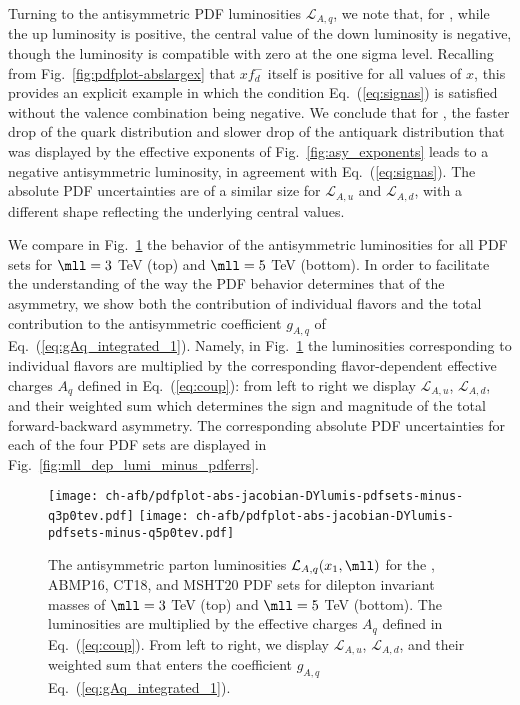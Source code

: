 Turning to the antisymmetric PDF luminosities $\mathcal{L}_{A,q}$,
we note  that, for , while the up luminosity is
positive, the central value of the down luminosity is negative, though
the luminosity is compatible with zero at the one sigma level.
%
Recalling
from Fig.~\ref{fig:pdfplot-abslargex} that $xf_{d}^-$ itself is
positive for all values of $x$,  this provides an explicit example in
which the condition Eq.~(\ref{eq:signas}) is satisfied without the valence
combination being negative.
%
We conclude that for , the faster
drop of the quark distribution and slower drop of the antiquark
distribution that was displayed by the effective exponents of
Fig.~\ref{fig:asy_exponents} leads to a negative antisymmetric
luminosity, in agreement with Eq.~(\ref{eq:signas}).
The absolute PDF uncertainties are of a similar size for
$\mathcal{L}_{A,u}$ and $\mathcal{L}_{A,d}$, with a different shape
reflecting the underlying central values.

We compare
in Fig.~\ref{fig:mll_dep_lumi_minus}
the behavior of the antisymmetric luminosities for all PDF
sets for $\mll=3$ TeV (top) and $\mll=5$ TeV (bottom).
%
In order to facilitate the understanding of the way the PDF behavior
determines that of the asymmetry, we show both the contribution of
individual flavors and the total contribution
to the antisymmetric coefficient $g_{A,q}$ of
Eq.~(\ref{eq:gAq_integrated_1}). Namely, in
Fig.~\ref{fig:mll_dep_lumi_minus} the luminosities corresponding to
individual flavors are multiplied by the corresponding flavor-dependent
effective charges $A_q$ defined in Eq.~(\ref{eq:coup}):
from left to right we display $\mathcal{L}_{A,u}$,  $\mathcal{L}_{A,d}$,
and their weighted sum
 which determines
the sign and magnitude of the total forward-backward asymmetry.
%
The corresponding absolute PDF uncertainties for each of the four PDF sets
are displayed in  Fig.~\ref{fig:mll_dep_lumi_minus_pdferrs}.

\begin{figure}[!t]
 \centering
 \texttt{[image: ch-afb/pdfplot-abs-jacobian-DYlumis-pdfsets-minus-q3p0tev.pdf]}
 \texttt{[image: ch-afb/pdfplot-abs-jacobian-DYlumis-pdfsets-minus-q5p0tev.pdf]}
 \caption{The antisymmetric 
   parton luminosities $\mathcal{L}_{A,q}(x_1,\mll)$ for the , ABMP16,
   CT18, and MSHT20 \nnlo PDF sets for dilepton
   invariant masses of
   $\mll=3$ TeV (top) and $\mll=5$ TeV (bottom).
   The luminosities are multiplied by the effective charges
   $A_q$ defined in Eq.~(\ref{eq:coup}).
   From left to right, we display $\mathcal{L}_{A,u}$,  $\mathcal{L}_{A,d}$,
   and their weighted sum that enters the  coefficient $g_{A,q}$ Eq.~(\ref{eq:gAq_integrated_1}).
    }    
 \label{fig:mll_dep_lumi_minus}
\end{figure}

